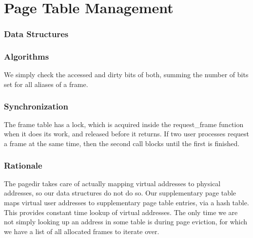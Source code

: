 \part{Page Table Management}

\section{Data Structures}


\section{Algorithms}



We simply check the accessed and dirty bits of both, summing the number of bits
set for all aliases of a frame.

\section{Synchronization}


The frame table has a lock, which is acquired inside the request\_frame
function when it does its work, and released before it returns. If two user
processes request a frame at the same time, then the second call blocks
until the first is finished.

\section{Rationale}


The pagedir takes care of actually mapping virtual addresses to physical
addresses, so our data structures do not do so. Our supplementary page table
maps virtual user addresses to supplementary page table entries, via a hash
table. This provides constant time lookup of virtual addresses. The only
time we are not simply looking up an address in some table is during page
eviction, for which we have a list of all allocated frames to iterate over.
